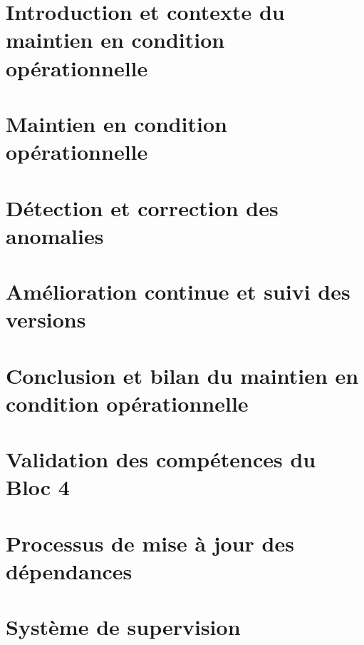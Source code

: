 \documentclass[11pt,twoside]{report}
\begin{document}
    
    \tableofcontents

    \chapter*{Introduction et contexte du maintien en condition opérationnelle}
    

    \chapter{Maintien en condition opérationnelle}
    
    

    \chapter{Détection et correction des anomalies}
    
    

    \chapter{Amélioration continue et suivi des versions}
    
    
    

    \chapter*{Conclusion et bilan du maintien en condition opérationnelle}
    

    \appendix
    \chapter{Validation des compétences du Bloc 4}
    

    \chapter{Processus de mise à jour des dépendances}
    

    \chapter{Système de supervision}
    
\end{document}
